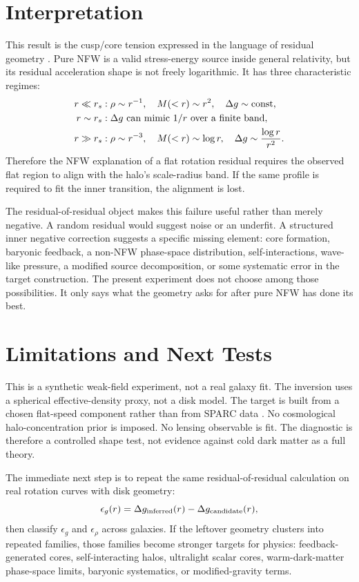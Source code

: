 \documentclass[10pt]{article}
\begin{document}
\section{Interpretation}

This result is the cusp/core tension expressed in the language of residual
geometry \citep{deBlok2010}. Pure NFW is a valid stress-energy source inside
general relativity, but its residual acceleration shape is not freely
logarithmic. It has three characteristic regimes:
\begin{align}
r\ll r_s &: \rho\sim r^{-1},\quad M(<r)\sim r^2,\quad \Delta g\sim {\rm const},\\
r\sim r_s &: \Delta g \text{ can mimic } 1/r \text{ over a finite band},\\
r\gg r_s &: \rho\sim r^{-3},\quad M(<r)\sim \log r,\quad
\Delta g\sim \frac{\log r}{r^2}.
\end{align}
Therefore the NFW explanation of a flat rotation residual requires the observed
flat region to align with the halo's scale-radius band. If the same profile is
required to fit the inner transition, the alignment is lost.

The residual-of-residual object makes this failure useful rather than merely
negative. A random residual would suggest noise or an underfit. A structured
inner negative correction suggests a specific missing element: core formation,
baryonic feedback, a non-NFW phase-space distribution, self-interactions,
wave-like pressure, a modified source decomposition, or some systematic error
in the target construction. The present experiment does not choose among those
possibilities. It only says what the geometry asks for after pure NFW has done
its best.

\section{Limitations and Next Tests}

This is a synthetic weak-field experiment, not a real galaxy fit. The inversion
uses a spherical effective-density proxy, not a disk model. The target is built
from a chosen flat-speed component rather than from SPARC data
\citep{Lelli2016}. No cosmological halo-concentration prior is imposed. No
lensing observable is fit. The diagnostic is therefore a controlled shape test,
not evidence against cold dark matter as a full theory.

The immediate next step is to repeat the same residual-of-residual calculation
on real rotation curves with disk geometry:
\begin{equation}
\epsilon_g(r)
=
\Delta g_{\rm inferred}(r)
-
\Delta g_{\rm candidate}(r),
\end{equation}
then classify $\epsilon_g$ and $\epsilon_\rho$ across galaxies. If the leftover
geometry clusters into repeated families, those families become stronger
targets for physics: feedback-generated cores, self-interacting halos,
ultralight scalar cores, warm-dark-matter phase-space limits, baryonic
systematics, or modified-gravity terms.
\end{document}
